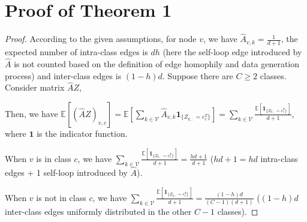 \documentclass{article}
\newcommand{\0}{{\boldsymbol{0}}}
\newcommand{\6}{{\partial}}
\newcommand{\8}{{\infty}}
\newcommand{\4}{{\nabla}}
\begin{document}
\section{Proof of Theorem 1}
\label{appendix:proof_theorem1}
\begin{proof}


According to the given assumptions, for node $v$, we have $\hat{A}_{v,k}=\frac{1}{d+1}$, the expected number of intra-class edges is $dh$ (here the self-loop edge introduced by $\hat{A}$ is not counted based on the definition of edge homophily and data generation process) and inter-class edges is $(1-h)d$. Suppose there are $C \geq 2$ classes. Consider matrix $\hat{A}Z$,

Then, we have $\mathbb{E}\left[(\hat{A}Z)_{v,c}\right] =  \mathbb{E}\left[\sum\limits_{k \in \mathcal{V}} \hat{A}_{v,k} \textbf{1}_{\{Z_{k,:}= e_c^T\}}\right] = \sum\limits_{k \in \mathcal{V}} \frac{\mathbb{E}\left[\textbf{1}_{\{Z_{k,:}= e_c^T\}}\right] }{d+1}$, where $\bm{1}$ is the indicator function.

When $v$ is in class $c$, we have $\sum\limits_{k \in \mathcal{V}} \frac{\mathbb{E}\left[ \textbf{1}_{\{Z_{k,:}= e_c^T\}}\right]}{d+1} = \frac{hd+1}{d+1}$ ($hd+1=hd$ intra-class edges $+$ 1 self-loop introduced by $\hat{A}$).

When $v$ is not in class $c$, we have $\sum\limits_{k \in \mathcal{V}} \frac{\mathbb{E}\left[ \textbf{1}_{\{Z_{k,:}= e_c^T\}}\right]}{d+1} = \frac{(1-h)d}{(C-1)(d+1)}$ ($(1-h)d$ inter-class edges uniformly distributed in the other $C-1$ classes).


\end{proof}
\end{document}
